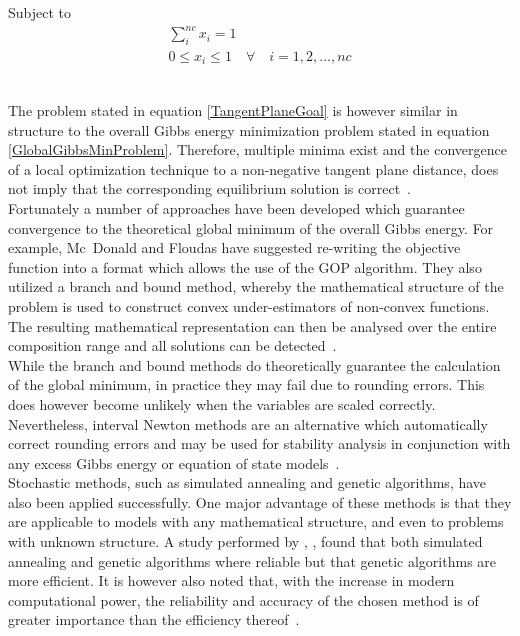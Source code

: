 Subject to\
\begin{eqnarray}
\sum_{i}^{nc} x_{i} = 1\\
0 \leq x_{i} \leq 1 \quad \forall \quad i = 1, 2, \ldots, nc 
\end{eqnarray}\

The problem stated in equation \ref{TangentPlaneGoal} is however similar in structure to the overall Gibbs energy minimization problem stated in equation \ref{GlobalGibbsMinProblem}. Therefore, multiple minima exist and the convergence of a local optimization technique to a non-negative tangent plane distance, does not imply that the corresponding equilibrium solution is correct~\cite{GlobalOptAndAnalysisGibbsEnergy, ReliablePhaseStability}.\\

Fortunately a number of approaches have been developed which guarantee convergence to the theoretical global minimum of the overall Gibbs energy. For example, Mc~Donald and Floudas have suggested re-writing the objective function into a format which allows the use of the GOP algorithm. They also utilized a branch and bound method, whereby the mathematical structure of the problem is used to construct convex under-estimators of non-convex functions. The resulting mathematical representation can then be analysed over the entire composition range and all solutions can be detected~\cite{GlobalOptAndAnalysisGibbsEnergy, GlobalOptPhaseAndChemicalEquil}.\\

While the branch and bound methods do theoretically guarantee the calculation of the global minimum, in practice they may fail due to rounding errors. This does however become unlikely when the variables are scaled correctly. Nevertheless, interval Newton methods are an alternative which automatically correct rounding errors and may be used for stability analysis in conjunction with any excess Gibbs energy or equation of state models~\cite{ReliablePhaseStability, IntervalAnalysisPhaseStability}.\\

Stochastic methods, such as simulated annealing and genetic algorithms, have also been applied successfully. One major advantage of these methods is that they are applicable to models with any mathematical structure, and even to problems with unknown structure. A study performed by \citeauthor{PhaseEquilCalcsESandGEM}, \citeyear{PhaseEquilCalcsESandGEM}, found that both simulated annealing and genetic algorithms where reliable but that genetic algorithms are more efficient. It is however also noted that, with the increase in modern computational power, the reliability and accuracy of the chosen method is of greater importance than the efficiency thereof~\cite{PhaseEquilCalcsESandGEM}.\\

